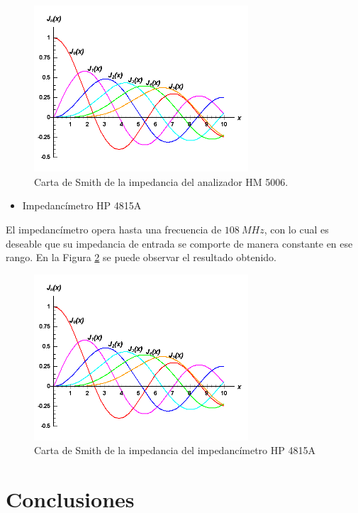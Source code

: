 \documentclass[a4paper,10pt]{article}
\begin{document}
		\begin{figure}[!htb]
			\centering
			\includegraphics[width=8cm]
			{Imagenes/bessel.png}
			\caption{Carta de Smith de la impedancia del analizador HM 5006.}
			\label{tranferenciacHM} 
		\end{figure}		
		\begin{itemize}
			\item Impedanc\'imetro HP 4815A
		\end{itemize}
		
		\indent El impedanc\'imetro opera hasta una frecuencia de $108~MHz$, con
		lo cual es deseable que su impedancia de entrada se comporte de manera 
		constante en ese rango. En la Figura 
		\ref*{tranferenciaimpedanciamiterro} se puede observar el resultado 
		obtenido.
		
		\begin{figure}[!htb]
			\centering
			\includegraphics[width=8cm]
			{Imagenes/bessel.png}
			\caption{Carta de Smith de la impedancia del impedanc\'imetro HP 
			4815A}
			\label{tranferenciaimpedanciamiterro} 
		\end{figure}		
	\section{Conclusiones}
	\indent
\end{document}
